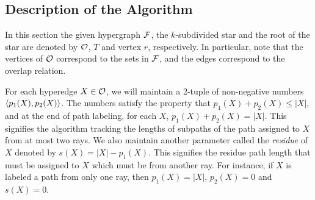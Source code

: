 \subsection{Description of the Algorithm}
\label{sec:ksubstaralgo}
In this section the given hypergraph ${\cal F}$, the $k$-subdivided star
and the root of the star are denoted by ${\cal O}$, $T$ and vertex $r$,
respectively.  In particular, note that the vertices of ${\cal O}$
correspond to the sets in ${\cal F}$, and the edges correspond to the
overlap relation.

\noindent
For each hyperedge $X \in {\cal O}$, we will maintain a 2-tuple of non-negative
 numbers $\left\langle p_1(X), p_2(X) \right\rangle$.  The numbers satisfy the property that
 $p_1(X) + p_2(X) \leq |X|$, and at the end of path labeling, for each
 $X$, $p_1(X) + p_2(X) = |X|$.  This signifies the algorithm tracking
 the lengths of subpaths of the path assigned to $X$ from at most two
 rays. We also maintain another parameter called the {\em residue} of
 $X$ denoted by $s(X)=|X| - p_1(X)$. This signifies the residue path
 length that must be assigned to $X$ which must be from another
 ray. For instance, if $X$ is labeled a path from only one ray, then
 $p_1(X) = |X|$, $p_2(X) = 0$ and $s(X) = 0$.

